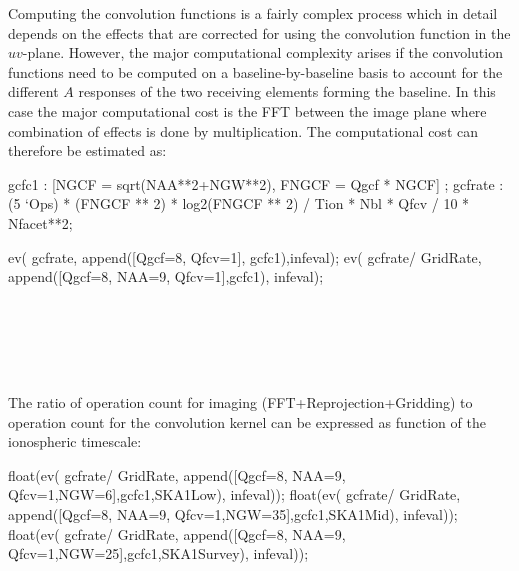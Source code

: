 \documentclass[useAMS,usenatbib,referee]{article}
\begin{document}
Computing the convolution functions is a fairly complex process which
in detail depends on the effects that are corrected for using the
convolution function in the $uv$-plane. However, the major
computational complexity arises if the convolution functions need to
be computed on a baseline-by-baseline basis to account for the
different $A$ responses of the two receiving elements forming the
baseline.  In this case the major computational cost is the FFT
between the image plane where combination of effects is done by
multiplication.  The computational cost can therefore be estimated as:

\begin{maxima}[]
gcfc1 : [NGCF = sqrt(NAA**2+NGW**2),
         FNGCF = Qgcf * NGCF] ;
gcfrate : (5 `Ops) *  (FNGCF ** 2) * log2(FNGCF ** 2)  / Tion * Nbl *
Qfcv / 10 *
Nfacet**2;

ev( gcfrate, append([Qgcf=8, Qfcv=1], gcfc1),infeval);
ev( gcfrate/ GridRate, append([Qgcf=8, NAA=9, Qfcv=1],gcfc1),
infeval);

\maximaoutput*
\m  \left[ \mathrm{NGCF}=\sqrt{N_{\rm GW}^2+N_{\rm AA}^2} , \mathrm{FNGCF}=\mathrm{Qgcf}\,\mathrm{NGCF} \right] \\
\; \\
\; \\
 \\
\end{maxima}

The ratio of operation count for imaging (FFT+Reprojection+Gridding)
to operation count for the convolution kernel can be expressed as
function of the ionospheric timescale:

\begin{maxima}[]
float(ev( gcfrate/ GridRate, 
          append([Qgcf=8, NAA=9, Qfcv=1,NGW=6],gcfc1,SKA1Low), infeval));
float(ev( gcfrate/ GridRate, 
          append([Qgcf=8, NAA=9, Qfcv=1,NGW=35],gcfc1,SKA1Mid), infeval));
float(ev( gcfrate/ GridRate, 
          append([Qgcf=8, NAA=9, Qfcv=1,NGW=25],gcfc1,SKA1Survey), infeval));
\maximaoutput*
{}\; \\
\; \\
\; \\
\end{maxima}
\end{document}
